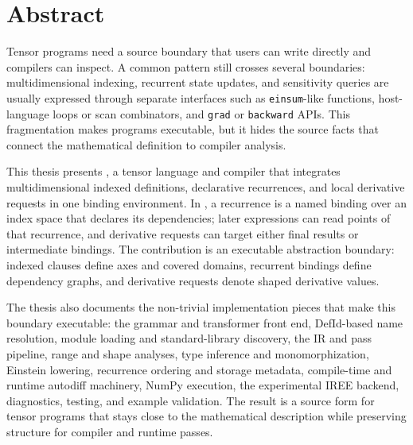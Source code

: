 \chapter*{Abstract}

Tensor programs need a source boundary that users can write directly and
compilers can inspect. A common pattern still crosses several boundaries:
multidimensional indexing, recurrent state updates, and sensitivity queries are
usually expressed through separate interfaces such as \texttt{einsum}-like
functions, host-language loops or scan combinators, and \texttt{grad} or
\texttt{backward} APIs. This fragmentation makes programs executable, but it
hides the source facts that connect the mathematical definition to compiler
analysis.

This thesis presents \einlang{}, a tensor language and compiler that integrates
multidimensional indexed definitions, declarative recurrences, and local
derivative requests in one binding environment. In \einlang{}, a recurrence is a
named binding over an index space that declares its dependencies; later
expressions can read points of that recurrence, and derivative requests can
target either final results or intermediate bindings. The contribution is an
executable abstraction boundary: indexed clauses define axes and covered
domains, recurrent bindings define dependency graphs, and derivative requests
denote shaped derivative values.

The thesis also documents the non-trivial implementation pieces that make this
boundary executable: the grammar and transformer front end, DefId-based name
resolution, module loading and standard-library discovery, the IR and pass
pipeline, range and shape analyses, type inference and monomorphization,
Einstein lowering, recurrence ordering and storage metadata, compile-time and
runtime autodiff machinery, NumPy execution, the experimental IREE backend,
diagnostics, testing, and example validation. The result is a source form for
tensor programs that stays close to the mathematical description while
preserving structure for compiler and runtime passes.
